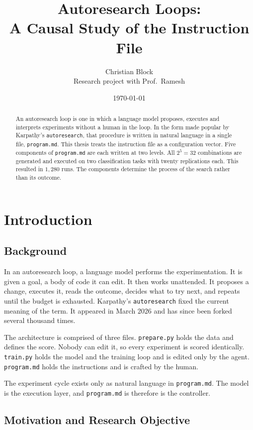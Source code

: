 \documentclass[11pt]{article}
\title{Autoresearch Loops:\\A Causal Study of the Instruction File}
\author{Christian Block\\\small Research project with Prof.\ Ramesh}
\date{\today}
\begin{document}
\maketitle

\begin{abstract}
An autoresearch loop is one in which a language model proposes, executes and interprets experiments without a human in the loop. In the form made popular by Karpathy's \texttt{autoresearch}, that procedure is written in natural language in a single  file, \texttt{program.md}. This thesis treats the instruction file as a configuration vector. Five components of \texttt{program.md} are each written at two levels. All $2^5 = 32$ combinations are generated and executed on two classification tasks with twenty replications each. This resulted in $1{,}280$ runs. The components determine the process of the search rather than its outcome.  \end{abstract}

\section{Introduction}
\label{sec:intro}

\subsection{Background}

In an autoresearch loop, a language model performs the experimentation. It is given a goal, a body of code it can edit. It then works unattended. It proposes a change, executes it, reads the outcome, decides what to try next, and repeats until the budget is exhausted. Karpathy's \texttt{autoresearch} \cite{Karpathy2026autoresearch} fixed the current meaning of the term. It appeared in March 2026 and has since been forked several thousand times.

The architecture is comprised of three files. \texttt{prepare.py} holds the data and defines the score. Nobody can edit it, so every experiment is scored identically. \texttt{train.py} holds the model and the training loop and is edited only by the agent. \texttt{program.md} holds the instructions and is crafted by the human.

The experiment cycle exists only as natural language in \texttt{program.md}. The model is the execution layer, and \texttt{program.md} is therefore is the controller.

\subsection{Motivation and Research Objective}
\end{document}
